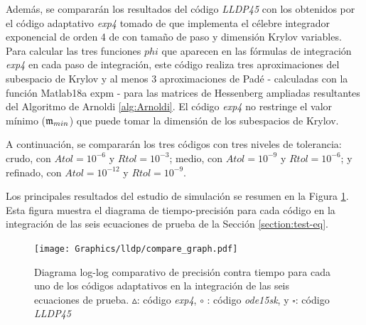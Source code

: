Además, se compararán los resultados del código \emph{LLDP45} con los obtenidos por el código adaptativo \emph{exp4} tomado de \cite{jansing2011expode} que implementa el célebre integrador exponencial de orden 4 de \cite{hochbruck1998exponential} con tamaño de paso y dimensión Krylov variables. Para calcular las tres funciones $phi$ que aparecen en las fórmulas de integración \emph{exp4} en cada paso de integración, este código realiza tres aproximaciones del subespacio de Krylov y al menos 3 aproximaciones de Padé - calculadas con la función Matlab18a expm - para las matrices de Hessenberg ampliadas resultantes del Algoritmo de Arnoldi \ref{alg:Arnoldi}. El código \emph{exp4} no restringe el valor mínimo ($\mathfrak{m}_{min}$) que puede tomar la dimensión de los subespacios de Krylov.

A continuación, se compararán los tres códigos con tres niveles de tolerancia: crudo, con $ Atol = 10^{-6}$ y $Rtol = 10^{-3}$; medio, con $Atol = 10^{-9}$ y $Rtol = 10^{-6}$; y refinado, con $ Atol = 10^{-12}$ y $Rtol = 10^{-9}$.

Los principales resultados del estudio de simulación se resumen en la Figura \ref{num-exp-lldp-var-step:Fig1}. Esta figura muestra el diagrama de tiempo-precisión para cada código en la integración de las seis ecuaciones de prueba de la Sección \ref{section:test-eq}.

\begin{figure}
	\begin{center}
    \hspace{-0.5in}
	\texttt{[image: Graphics/lldp/compare\_graph.pdf]}
	\vspace{-0.75in}
	\caption{ Diagrama log-log comparativo de precisión contra tiempo para cada uno de los códigos adaptativos en la integración de las seis ecuaciones de prueba. $\vartriangle$: código \emph{exp4}, $\circ$ : código \emph{ode15sk}, y $\square$: código \emph{LLDP45}}
	\label{num-exp-lldp-var-step:Fig1}
	\end{center}
\end{figure}

